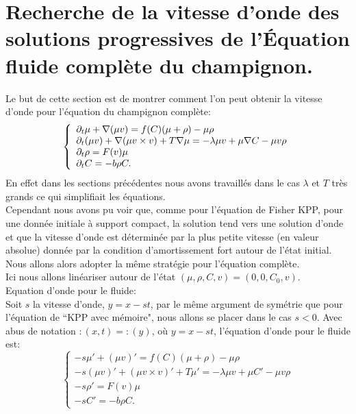 \documentclass[11pt]{article}
\begin{document}
\fi
\section{Recherche de la vitesse d'onde des solutions progressives de l'Équation fluide complète du champignon.}
Le but de cette section est de montrer comment l'on peut obtenir la vitesse d’onde pour l’équation du champignon complète:  
\begin{equation}  \left\{
                \begin{array}{ll}
                \partial_t\mu + \nabla(\mu v) = f(C)(\mu + \rho) -\mu\rho \\
                   \partial_t(\mu v)+\nabla(\mu v\times v) +T\nabla\mu=-\lambda\mu v+\mu\nabla C-\mu v \rho \\
                 \partial_t\rho=  F(v) \mu \\
                  \partial_t C = -b\rho C.
                \end{array}
              \right.
\end{equation} 
En effet dans les sections précédentes nous avons travaillés dans le cas $\lambda$ et $T$ très grands ce qui simplifiait les équations.\\
Cependant nous avons pu voir que, comme pour l’équation de Fisher KPP, pour une donnée initiale à support compact, la solution tend vers une solution d'onde et que la vitesse d'onde est déterminée par la plus petite vitesse (en valeur absolue) donnée par la condition d'amortissement fort autour de l'état initial.\\
Nous allons alors adopter la même stratégie pour l’équation complète.\\
Ici nous allons linéariser autour de l’état $(\mu,\rho,C,v) = (0,0,C_0,v)$.\\
Equation d'onde pour le fluide:\\
Soit $s$ la vitesse d'onde, $y=x-st$, par le même argument de symétrie que pour l’équation de  ``KPP avec mémoire", nous allons se placer dans le cas $s<0$. Avec abus de notation $ :(x,t) = :(y)$, où $y=x-st$, l’équation d'onde pour le fluide est:
\begin{equation}\label{eq:FWS_BDNG}  \left\{
                \begin{array}{ll}
                -s\mu' + (\mu v)' = f(C)(\mu + \rho) -\mu\rho \\
                   -s (\mu v)'+(\mu v\times v)' +T\mu'=-\lambda\mu v+\mu C'-\mu v \rho \\
                 -s \rho '=  F(v) \mu \\
                  -sC' = -b\rho C.
                \end{array}
              \right.
\end{equation} 
\end{document}

